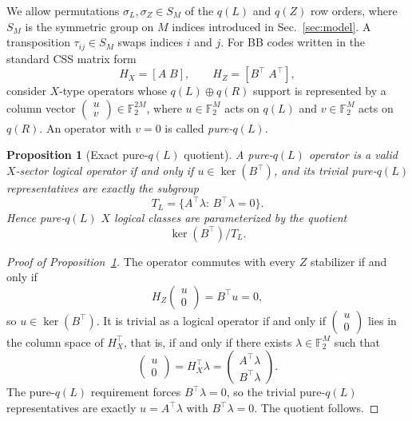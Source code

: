 \documentclass[
aps,
prx,
10pt,
twocolumn,
groupedaddress,
longbibliography,
nofootinbib,
floatfix
]{revtex4-2}
\newtheorem{proposition}{Proposition}
\theoremstyle{definition}
\DeclareMathOperator{\kerop}{ker}
\newcommand{\F}{\mathbb{F}_2}
\newcommand{\TL}{T_L}
\begin{document}
We allow permutations $\sigma_L,\sigma_Z\in S_M$ of the $q(L)$ and $q(Z)$ row orders, where $S_M$ is the symmetric group on $M$ indices introduced in Sec.~\ref{sec:model}. A transposition $\tau_{ij}\in S_M$ swaps indices $i$ and $j$. For BB codes written in the standard CSS matrix form
\begin{equation}
H_X=\left[A\;B\right],\qquad H_Z=\left[B^\top\;A^\top\right],
\end{equation}
consider $X$-type operators whose $q(L)\oplus q(R)$ support is represented by a column vector $\begin{pmatrix}u\\v\end{pmatrix}\in\F^{2M}$, where $u\in\F^M$ acts on $q(L)$ and $v\in\F^M$ acts on $q(R)$. An operator with $v=0$ is called \emph{pure-$q(L)$}.

\begin{proposition}[Exact pure-$q(L)$ quotient]
\label{prop:pureL-main}
A pure-$q(L)$ operator is a valid $X$-sector logical operator if and only if $u\in\kerop(B^\top)$, and its trivial pure-$q(L)$ representatives are exactly the subgroup
\begin{equation}
\TL=\{A^\top\lambda:\,B^\top\lambda=0\}.
\end{equation}
Hence pure-$q(L)$ $X$ logical classes are parameterized by the quotient
\begin{equation}
\kerop(B^\top)/\TL.
\label{eq:pureL-quotient-main}
\end{equation}
\end{proposition}

\begin{proof}[Proof of Proposition~\ref{prop:pureL-main}]
The operator commutes with every $Z$ stabilizer if and only if
\begin{equation}
H_Z\begin{pmatrix}u\\0\end{pmatrix}=B^\top u=0,
\end{equation}
so $u\in\kerop(B^\top)$. It is trivial as a logical operator if and only if $\begin{pmatrix}u\\0\end{pmatrix}$ lies in the column space of $H_X^\top$, that is, if and only if there exists $\lambda\in\F^M$ such that
\begin{equation}
\begin{pmatrix}u\\0\end{pmatrix}=H_X^\top\lambda=\begin{pmatrix}A^\top\lambda\\B^\top\lambda\end{pmatrix}.
\end{equation}
The pure-$q(L)$ requirement forces $B^\top\lambda=0$, so the trivial pure-$q(L)$ representatives are exactly $u=A^\top\lambda$ with $B^\top\lambda=0$. The quotient follows.
\end{proof}
\end{document}
